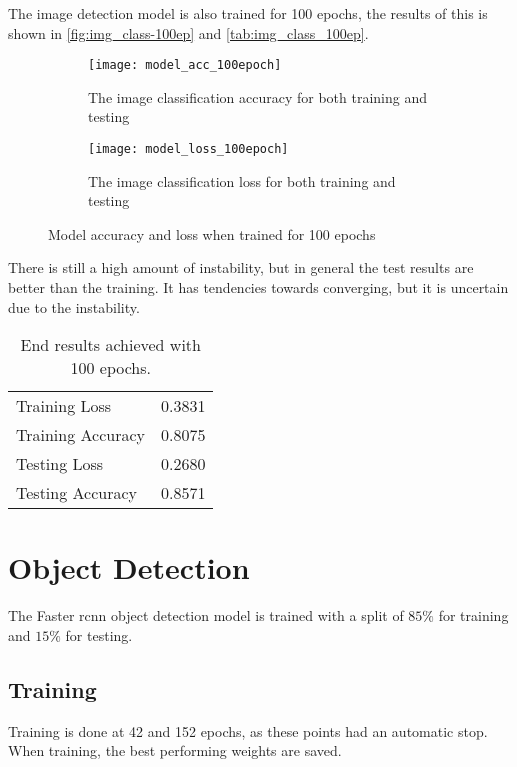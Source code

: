 The image detection model is also trained for 100 epochs, the results of this is shown in \autoref{fig:img_class-100ep} and \autoref{tab:img_class_100ep}.
\begin{figure}[H]
	\centering
	\begin{subfigure}{0.48\textwidth}
		\texttt{[image: model\_acc\_100epoch]}
		\caption{The image classification accuracy for both training and testing}
		\label{fig:img_acc-100}
	\end{subfigure}
	\begin{subfigure}{0.48\textwidth}
		\texttt{[image: model\_loss\_100epoch]}
		\caption{The image classification loss for both training and testing}
		\label{fig:img_loss-100}
	\end{subfigure}
\caption{Model accuracy and loss when trained for 100 epochs}
\label{fig:img_class-100ep}
\end{figure}
There is still a high amount of instability, but in general the test results are better than the training. It has tendencies towards converging, but it is uncertain due to the instability.

\begin{table}[H]
	\centering
	\caption{End results achieved with 100 epochs.}
	\begin{tabular}{|l|r|}
		\hline
		Training Loss            		& 0.3831	\\ \rowcolor{lightGrey}\hline
		Training Accuracy        	    & 0.8075 	\\ \hline
		Testing Loss     				& 0.2680	\\ \rowcolor{lightGrey}\hline
		Testing Accuracy 				& 0.8571	\\ \hline
	\end{tabular}
	\label{tab:img_class_100ep}
\end{table}

\section{Object Detection}
The Faster \gls{rcnn} object detection model is trained with a split of $85\%$ for training and $15\%$ for testing.

\subsection{Training}
Training is done at 42 and 152 epochs, as these points had an automatic stop. When training, the best performing weights are saved.

